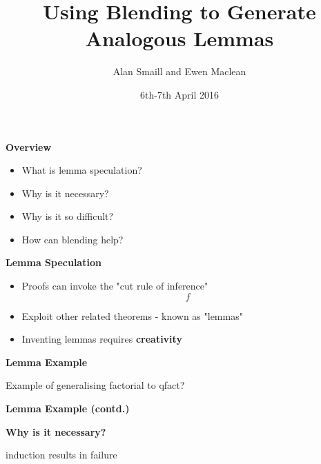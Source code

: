 \documentclass{beamer}
\title[] %
{Using Blending to Generate Analogous Lemmas}
\author[] %
{Alan Smaill and Ewen Maclean}
\institute[] %
{Edinburgh University}
\date[] %
{6th-7th April 2016}
\begin{document}
\titlepage


\begin{frame}
\begin{center}{\bf Overview}
\end{center}
\begin{itemize}
\item{What is lemma speculation?}
\item{Why is it necessary?}
\item{Why is it so difficult?}
\item{How can blending help?}
\end{itemize}
\end{frame}

\newpage

\begin{frame}
\begin{center}{\bf Lemma Speculation}\end{center}
\begin{itemize}
\item{Proofs can invoke the "cut rule of inference"}
$$f$$
\item{Exploit other related theorems - known as "lemmas"}
\item{Inventing lemmas requires {\bf creativity}}
\end{itemize}
\end{frame}

\newpage

\begin{frame}
\begin{center}{\bf Lemma Example}\end{center}
Example of generalising factorial to qfact?

\end{frame}

\newpage

\begin{frame}
\begin{center}{\bf Lemma Example (contd.)}\end{center}

\end{frame}

\newpage

\begin{frame}
\begin{center}{\bf Why is it necessary?}\end{center}
induction results in failure

\end{frame}
\end{document}
